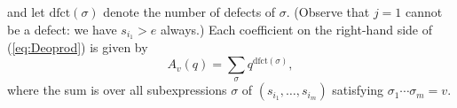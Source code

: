 \documentclass[12pt]{amsart}
\theoremstyle{definition}
\numberwithin{equation}{section}
\newcommand{\wtc}[2]{\widetilde{C}_{#1}}
\newcommand{\defeq}{:=}
\newcommand{\dfct}{\mathrm{dfct}}
\newcommand{\ntksp}{\negthickspace}
\begin{document}
and let $\dfct(\sigma)$ denote the number of defects of $\sigma$. 
(Observe that $j=1$ cannot be a defect: we have $s_{i_1} > e$ always.) 
Each coefficient on the right-hand side of (\ref{eq:Deoprod}) is given by
\begin{equation}\label{eq:Deodefectformula}
    A_v(q) = \sum_\sigma q^{\dfct(\sigma)},
\end{equation}
where the sum is over all subexpressions
$\sigma$ of 
$(s_{i_1},\dotsc, s_{i_m})$
satisfying $\sigma_1 \cdots \sigma_m = v$.

\end{document}
